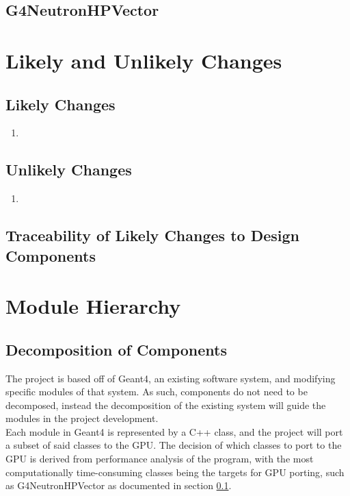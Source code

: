 \documentclass[12pt]{article}
\begin{document}
\subsection{G4NeutronHPVector}\label{subsec_G4NeutronHPVector} %

\section{Likely and Unlikely Changes}

\subsection{Likely Changes} %
\begin{enumerate}
\item
\end{enumerate}

\subsection{Unlikely Changes} %
\begin{enumerate}
\item
\end{enumerate}

\subsection{Traceability of Likely Changes to Design Components}

\section{Module Hierarchy}%
\subsection{Decomposition of Components}
The project is based off of Geant4, an existing software system, and modifying specific modules of that system. As such, components do not need to be decomposed, instead the decomposition of the existing system will guide the modules in the project development.\\

Each module in Geant4 is represented by a C++ class, and the project will port a subset of said classes to the GPU. The decision of which classes to port to the GPU is derived from performance analysis of the program, with the most computationally time-consuming classes being the targets for GPU porting, such as G4NeutronHPVector as documented in section \ref{subsec_G4NeutronHPVector}.
\end{document}
